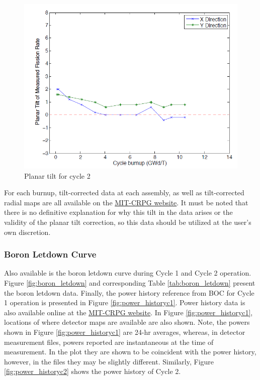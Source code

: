 \begin{figure}[hbtp]
  \centering
  \includegraphics[width=5.0in]{expdata/figs/tilt_cycle2.png}
  \caption{Planar tilt for cycle 2
  \label{fig:cyc_2_tilt}}
\end{figure}

For each burnup, tilt-corrected data at each assembly, as well as tilt-corrected radial 
maps are all available on the {\color{blue}\href{http://crpg.mit.edu/pub/beavrs}{MIT-CRPG website}}. It must be noted that there is no 
definitive explanation for why this tilt in the data arises or the validity of the 
planar tilt correction, so this data should be utilized at the user's own discretion.

\subsubsection{Boron Letdown Curve}
\label{sec:boron_letdown}
Also available is the boron letdown curve during Cycle 1 and Cycle 2 operation.
Figure \ref{fig:boron_letdown} and corresponding Table \ref{tab:boron_letdown}
present the boron letdown data. Finally, the power history reference from
\ac{BOC} for Cycle 1 operation is presented in Figure \ref{fig:power_historyc1}.
Power history data is also available online at the
{\color{blue}\href{http://crpg.mit.edu/pub/beavrs}{MIT-CRPG website}}. In Figure
\ref{fig:power_historyc1}, locations of where detector maps are available are
also shown. Note, the powers shown in Figure \ref{fig:power_historyc1} are 24-hr
averages, whereas, in detector measurement files, powers reported are
instantaneous at the time of measurement. In the plot they are shown to be
coincident with the power history, however, in the files they may be slightly
different. Similarly, Figure \ref{fig:power_historyc2} shows the power history
of Cycle 2.

